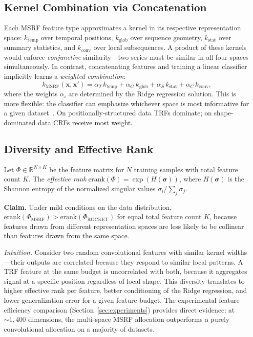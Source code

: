 \documentclass{article}
\begin{document}
\subsection{Kernel Combination via Concatenation}

Each MSRF feature type approximates a kernel in its respective representation space: $k_{\mathrm{temp}}$ over temporal positions, $k_{\mathrm{glob}}$ over sequence geometry, $k_{\mathrm{stat}}$ over summary statistics, and $k_{\mathrm{conv}}$ over local subsequences.
A product of these kernels would enforce \emph{conjunctive} similarity---two series must be similar in all four spaces simultaneously.
In contrast, concatenating features and training a linear classifier implicitly learns a \emph{weighted combination}:
\begin{equation}
  k_{\mathrm{MSRF}}(\mathbf{x}, \mathbf{x}') = \alpha_T\, k_{\mathrm{temp}} + \alpha_G\, k_{\mathrm{glob}} + \alpha_S\, k_{\mathrm{stat}} + \alpha_C\, k_{\mathrm{conv}},
\end{equation}
where the weights $\alpha_i$ are determined by the Ridge regression solution.
This is more flexible: the classifier can emphasize whichever space is most informative for a given dataset~\citep{rahimi2007random}.
On positionally-structured data TRFs dominate; on shape-dominated data CRFs receive most weight.

\subsection{Diversity and Effective Rank}

Let $\Phi \in \mathbb{R}^{N \times K}$ be the feature matrix for $N$ training samples with total feature count $K$.
The \emph{effective rank} $\mathrm{erank}(\Phi) = \exp(H(\boldsymbol{\sigma}))$, where $H(\boldsymbol{\sigma})$ is the Shannon entropy of the normalized singular values $\sigma_i / \sum_j \sigma_j$.

\textbf{Claim.}
Under mild conditions on the data distribution, $\mathrm{erank}(\Phi_{\mathrm{MSRF}}) > \mathrm{erank}(\Phi_{\mathrm{ROCKET}})$ for equal total feature count $K$, because features drawn from different representation spaces are less likely to be collinear than features drawn from the same space.

\textit{Intuition.}
Consider two random convolutional features with similar kernel widths---their outputs are correlated because they respond to similar local patterns.
A TRF feature at the same budget is uncorrelated with both, because it aggregates signal at a specific position regardless of local shape.
This diversity translates to higher effective rank per feature, better conditioning of the Ridge regression, and lower generalization error for a given feature budget.
The experimental feature efficiency comparison (Section~\ref{sec:experiments}) provides direct evidence: at ${\sim}1{,}400$ dimensions, the multi-space MSRF allocation outperforms a purely convolutional allocation on a majority of datasets.
\end{document}
